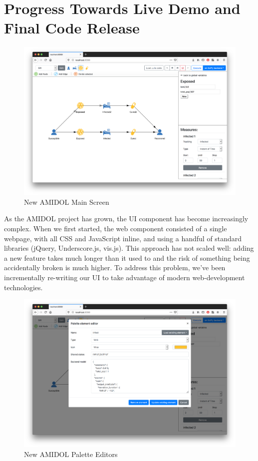 \documentclass[12pt]{galois-whitepaper}
\begin{document}
\section{Progress Towards Live Demo and Final Code Release}

  \begin{figure}
    \centering
    \includegraphics[width=\textwidth]{figs/mainscreen.png}
    \caption{New AMIDOL Main Screen}
    \label{Fig:MainScreen}
  \end{figure}

As the AMIDOL project has grown, the UI component has become
increasingly complex. When we first started, the web component
consisted of a single webpage, with all CSS and JavaScript inline, and
using a handful of standard libraries (jQuery, Underscore.js,
vis.js). This approach has not scaled well: adding a new feature takes
much longer than it used to and the risk of something being
accidentally broken is much higher. To address this problem, we’ve
been incrementally re-writing our UI to take advantage of modern
web-development technologies.

\begin{figure}
    \centering
    \includegraphics[width=\textwidth]{figs/palette.png}
    \caption{New AMIDOL Palette Editors}
    \label{Fig:PaletteScreen}
  \end{figure}
\end{document}
